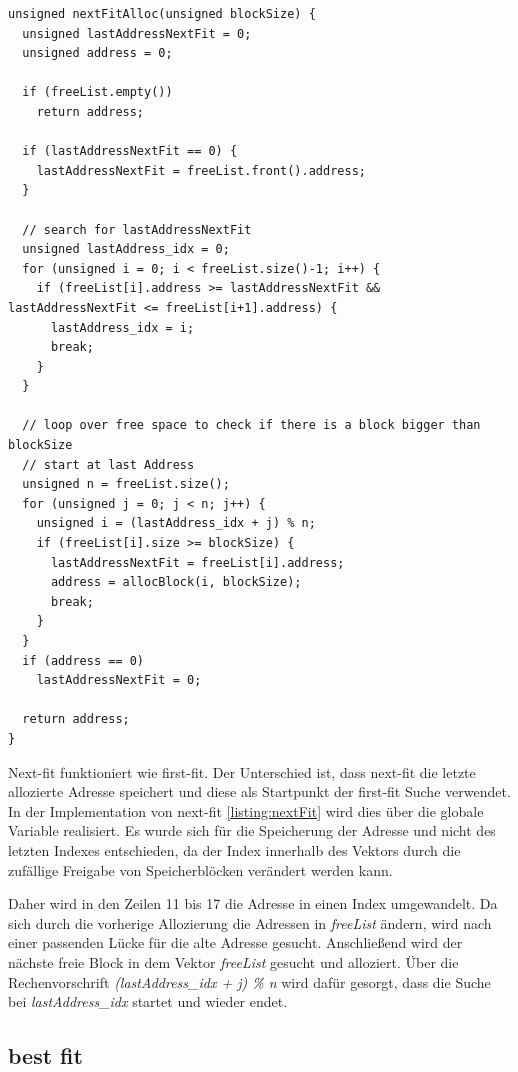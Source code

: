 \begin{lstlisting}[caption={next fit C-Implementation}, label=listing:nextFit]
unsigned nextFitAlloc(unsigned blockSize) {
  unsigned lastAddressNextFit = 0; 
  unsigned address = 0;

  if (freeList.empty())
    return address;

  if (lastAddressNextFit == 0) {
    lastAddressNextFit = freeList.front().address;
  }

  // search for lastAddressNextFit
  unsigned lastAddress_idx = 0;
  for (unsigned i = 0; i < freeList.size()-1; i++) {
    if (freeList[i].address >= lastAddressNextFit && lastAddressNextFit <= freeList[i+1].address) {
      lastAddress_idx = i;
      break;
    }
  }

  // loop over free space to check if there is a block bigger than blockSize
  // start at last Address
  unsigned n = freeList.size();
  for (unsigned j = 0; j < n; j++) {
    unsigned i = (lastAddress_idx + j) % n;
    if (freeList[i].size >= blockSize) {
      lastAddressNextFit = freeList[i].address;
      address = allocBlock(i, blockSize);
      break;
    }
  }
  if (address == 0)
    lastAddressNextFit = 0;

  return address;
}
\end{lstlisting}

Next-fit funktioniert wie first-fit. Der Unterschied ist, dass next-fit die letzte allozierte Adresse speichert und diese als Startpunkt der first-fit Suche verwendet. In der Implementation von next-fit \ref{listing:nextFit} wird dies über die globale Variable  realisiert. Es wurde sich für die Speicherung der Adresse und nicht des letzten Indexes entschieden, da der Index innerhalb des Vektors durch die zufällige Freigabe von Speicherblöcken verändert werden kann.

Daher wird in den Zeilen 11 bis 17 die Adresse in einen Index umgewandelt. Da sich durch die vorherige Allozierung die Adressen in \textit{freeList} ändern, wird nach einer passenden Lücke für die alte Adresse gesucht. Anschließend wird der nächste freie Block in dem Vektor \textit{freeList} gesucht und alloziert. Über die Rechenvorschrift \textit{(lastAddress\_idx + j) \% n} wird dafür gesorgt, dass die Suche bei \textit{lastAddress\_idx} startet und wieder endet.


\subsection{best fit}

